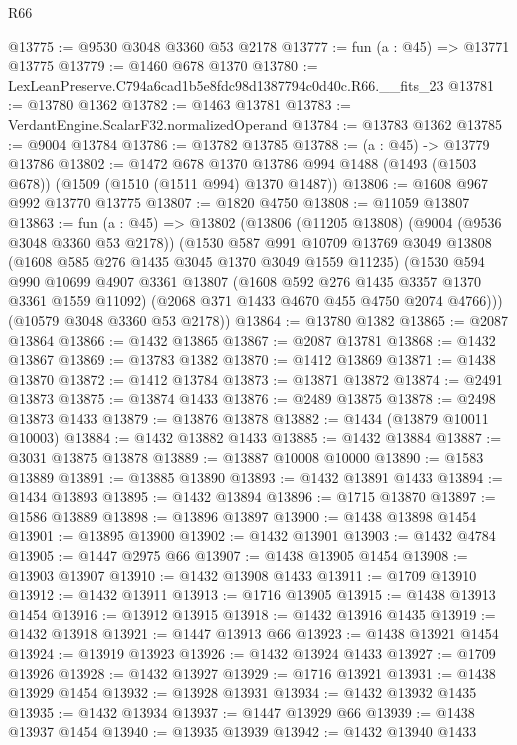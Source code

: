 \begin{lexlean}{R66}
\begin{coremodule}
@13775 := @9530 @3048 @3360 @53 @2178
@13777 := fun (a : @45) => @13771 @13775
@13779 := @1460 @678 @1370
@13780 := LexLeanPreserve.C794a6cad1b5e8fdc98d1387794c0d40c.R66.__fits_23
@13781 := @13780 @1362
@13782 := @1463 @13781
@13783 := VerdantEngine.ScalarF32.normalizedOperand
@13784 := @13783 @1362
@13785 := @9004 @13784
@13786 := @13782 @13785
@13788 := (a : @45) -> @13779 @13786
@13802 := @1472
    @678
    @1370
    @13786
    @994
    @1488
    (@1493 (@1503 @678))
    (@1509 (@1510 (@1511 @994) @1370 @1487))
@13806 := @1608 @967 @992 @13770 @13775
@13807 := @1820 @4750
@13808 := @11059 @13807
@13863 := fun (a : @45) =>
  @13802
    (@13806
      (@11205 @13808)
      (@9004 (@9536 @3048 @3360 @53 @2178))
      (@1530
        @587
        @991
        @10709
        @13769
        @3049
        @13808
        (@1608 @585 @276 @1435 @3045 @1370 @3049 @1559 @11235)
        (@1530
          @594
          @990
          @10699
          @4907
          @3361
          @13807
          (@1608 @592 @276 @1435 @3357 @1370 @3361 @1559 @11092)
          (@2068 @371 @1433 @4670 @455 @4750 @2074 @4766)))
      (@10579 @3048 @3360 @53 @2178))
@13864 := @13780 @1382
@13865 := @2087 @13864
@13866 := @1432 @13865
@13867 := @2087 @13781
@13868 := @1432 @13867
@13869 := @13783 @1382
@13870 := @1412 @13869
@13871 := @1438 @13870
@13872 := @1412 @13784
@13873 := @13871 @13872
@13874 := @2491 @13873
@13875 := @13874 @1433
@13876 := @2489 @13875
@13878 := @2498 @13873 @1433
@13879 := @13876 @13878
@13882 := @1434 (@13879 @10011 @10003)
@13884 := @1432 @13882 @1433
@13885 := @1432 @13884
@13887 := @3031 @13875 @13878
@13889 := @13887 @10008 @10000
@13890 := @1583 @13889
@13891 := @13885 @13890
@13893 := @1432 @13891 @1433
@13894 := @1434 @13893
@13895 := @1432 @13894
@13896 := @1715 @13870
@13897 := @1586 @13889
@13898 := @13896 @13897
@13900 := @1438 @13898 @1454
@13901 := @13895 @13900
@13902 := @1432 @13901
@13903 := @1432 @4784
@13905 := @1447 @2975 @66
@13907 := @1438 @13905 @1454
@13908 := @13903 @13907
@13910 := @1432 @13908 @1433
@13911 := @1709 @13910
@13912 := @1432 @13911
@13913 := @1716 @13905
@13915 := @1438 @13913 @1454
@13916 := @13912 @13915
@13918 := @1432 @13916 @1435
@13919 := @1432 @13918
@13921 := @1447 @13913 @66
@13923 := @1438 @13921 @1454
@13924 := @13919 @13923
@13926 := @1432 @13924 @1433
@13927 := @1709 @13926
@13928 := @1432 @13927
@13929 := @1716 @13921
@13931 := @1438 @13929 @1454
@13932 := @13928 @13931
@13934 := @1432 @13932 @1435
@13935 := @1432 @13934
@13937 := @1447 @13929 @66
@13939 := @1438 @13937 @1454
@13940 := @13935 @13939
@13942 := @1432 @13940 @1433

\end{coremodule}
\end{lexlean}
